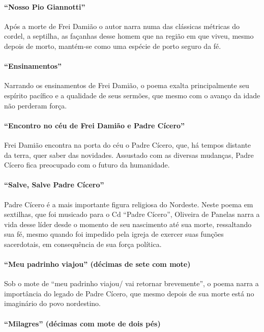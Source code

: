 \paragraph{``Nosso Pio Giannotti''}

Após a morte de Frei Damião o autor narra numa das clássicas métricas do
cordel, a septilha, as façanhas desse homem que na região em que viveu,
mesmo depois de morto, mantém-se como uma espécie de porto seguro da fé.

\paragraph{``Ensinamentos''}

Narrando os ensinamentos de Frei Damião, o poema exalta principalmente
seu espírito pacífico e a qualidade de seus sermões, que mesmo com o
avanço da idade não perderam força.

\paragraph{``Encontro no céu de Frei Damião e Padre Cícero''}

Frei Damião encontra na porta do céu o Padre Cícero,
que, há tempos distante da terra, quer saber das novidades. 
Assustado com as diversas mudanças, Padre Cícero fica preocupado com o futuro da
humanidade.

\paragraph{``Salve, Salve Padre Cícero''}

Padre Cícero é a mais importante figura religiosa do Nordeste. Neste
poema em sextilhas, que foi musicado para o Cd ``Padre
Cícero'', Oliveira de Panelas narra a vida desse líder desde o momento
de seu nascimento até sua morte, ressaltando sua fé, mesmo quando 
foi impedido pela igreja de exercer suas funções sacerdotais, em consequência
de sua força política.

\paragraph{``Meu padrinho viajou'' (décimas de sete com mote)}

Sob o mote de ``meu padrinho viajou/ vai retornar
brevemente'', o poema narra a importância do legado de Padre
Cícero, que mesmo depois de sua morte está no imaginário do povo nordestino.

\paragraph{``Milagres'' (décimas com mote de dois pés)}

